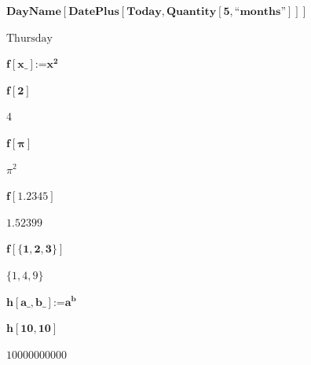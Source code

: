 \documentclass{article}
\begin{document}
\begin{doublespace}
\noindent\(\pmb{\text{DayName}[\text{DatePlus}[\text{Today},\text{Quantity}[5,\text{{``}months{''}}]]]}\)
\end{doublespace}

\begin{doublespace}
\noindent\(\text{Thursday}\)
\end{doublespace}

\begin{doublespace}
\noindent\(\pmb{f[\text{x$\_$}]\text{:=}x^2}\)
\end{doublespace}

\begin{doublespace}
\noindent\(\pmb{f[2]}\)
\end{doublespace}

\begin{doublespace}
\noindent\(4\)
\end{doublespace}

\begin{doublespace}
\noindent\(\pmb{f[\pi ]}\)
\end{doublespace}

\begin{doublespace}
\noindent\(\pi ^2\)
\end{doublespace}

\begin{doublespace}
\noindent\(\pmb{f[1.2345]}\)
\end{doublespace}

\begin{doublespace}
\noindent\(1.52399\)
\end{doublespace}

\begin{doublespace}
\noindent\(\pmb{f[\{1,2,3\}]}\)
\end{doublespace}

\begin{doublespace}
\noindent\(\{1,4,9\}\)
\end{doublespace}

\begin{doublespace}
\noindent\(\pmb{h[\text{a$\_$},\text{b$\_$}]\text{:=}a^b}\)
\end{doublespace}

\begin{doublespace}
\noindent\(\pmb{h[10,10]}\)
\end{doublespace}

\begin{doublespace}
\noindent\(10000000000\)
\end{doublespace}
\end{document}
